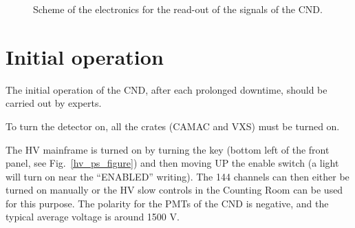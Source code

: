 \documentclass[12pt]{article}
\begin{document}
\begin{figure}
\begin{center}
\caption {Scheme of the electronics for the read-out of the signals of the CND.}
\label{daq_figure}
\end{center}
\end{figure}

\section{Initial operation}

The initial operation of the CND, after each prolonged downtime, should be carried out by experts. 

To turn the detector on, all the crates (CAMAC and VXS) must be turned on. 

The HV mainframe is turned on by turning the key (bottom left of the front panel, see Fig.~\ref{hv_ps_figure}) and then moving UP the enable switch (a light will turn on near the ``ENABLED'' writing). The 144 channels can then either be turned on manually or the HV slow controls in the Counting Room can be used for this purpose. The polarity for the PMTs of the CND is negative, and the typical average voltage is around 1500 V. 
\end{document}
